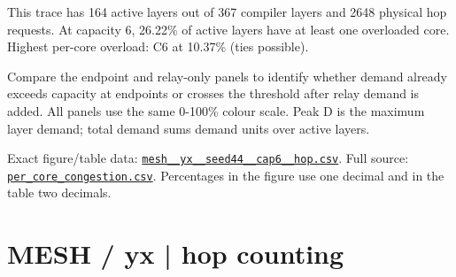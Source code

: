 \documentclass[10pt,a4paper]{article}
\begin{document}
This trace has 164 active layers out of 367 compiler layers and 2648 physical hop requests. At capacity 6, 26.22\% of active layers have at least one overloaded core. Highest per-core overload: C6 at 10.37\% (ties possible).\par
Compare the endpoint and relay-only panels to identify whether demand already exceeds capacity at endpoints or crosses the threshold after relay demand is added. All panels use the same 0-100\% colour scale. Peak D is the maximum layer demand; total demand sums demand units over active layers.\par
Exact figure/table data: \href{\detokenize{file:///home/dhruv-pansuriya/Documents/BTP/Compiler-Driven-ACE/output/pdf/qaoa_methods_congestion/tables/mesh__yx__seed44__cap6__hop.csv}}{\nolinkurl{mesh__yx__seed44__cap6__hop.csv}}. Full source: \href{\detokenize{file:///home/dhruv-pansuriya/Documents/BTP/Compiler-Driven-ACE/results/qaoa_2seed_2026-10-26/congestion/per_core_congestion.csv}}{\nolinkurl{per_core_congestion.csv}}. Percentages in the figure use one decimal and in the table two decimals.\par
\clearpage
\section*{MESH / yx | hop counting}
\end{document}
